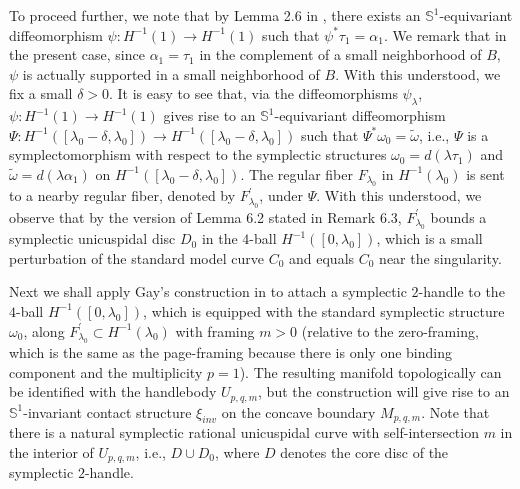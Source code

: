 \documentclass[11pt]{amsart}
\theoremstyle{plain}
\numberwithin{theorem}{section}
\theoremstyle{definition}
\newcommand{\s}{{\mathbb S}}
\begin{document}
To proceed further, we note that by Lemma 2.6 in \cite{C1}, there exists an $\s^1$-equivariant diffeomorphism 
$\psi: H^{-1}(1)\rightarrow H^{-1}(1)$ such that $\psi^\ast \tau_1=\alpha_1$. We remark that in the present case, since $\alpha_1=\tau_1$ in the complement of a small neighborhood of $B$, $\psi$ is actually supported in a small neighborhood of $B$. With this understood, we fix a small $\delta>0$. It is easy to see that, via the diffeomorphisms 
$\psi_\lambda$, $\psi: H^{-1}(1)\rightarrow H^{-1}(1)$ gives rise to an $\s^1$-equivariant diffeomorphism 
$\Psi: H^{-1}([\lambda_0-\delta,\lambda_0])\rightarrow H^{-1}([\lambda_0-\delta,\lambda_0])$ such that 
$\Psi^\ast \omega_0=\tilde{\omega}$, i.e., $\Psi$ is a symplectomorphism with respect to the symplectic structures 
$\omega_0=d(\lambda\tau_1)$ and $\tilde{\omega}=d(\lambda\alpha_1)$ on 
$H^{-1}([\lambda_0-\delta,\lambda_0])$. The regular fiber $F_{\lambda_0}$ in $H^{-1}(\lambda_0)$ is sent to a nearby regular fiber, denoted by $F_{\lambda_0}^\prime$, under $\Psi$. With this understood, we observe that 
by the version of Lemma 6.2 stated in Remark 6.3, 
$F_{\lambda_0}^\prime$ bounds a symplectic unicuspidal disc $D_0$ in the $4$-ball $H^{-1}([0,\lambda_0])$, 
which is a small perturbation of the standard model curve $C_0$ and equals $C_0$ near the singularity. 

Next we shall apply Gay's construction in \cite{G} to attach a symplectic $2$-handle to the $4$-ball 
$H^{-1}([0,\lambda_0])$, which is equipped with the standard symplectic structure $\omega_0$, along 
$F_{\lambda_0}^\prime\subset H^{-1}(\lambda_0)$ with framing $m>0$ (relative to the zero-framing, which is the same as the page-framing because there is only one binding component and the multiplicity $p=1$). The resulting manifold topologically can be identified with the handlebody $U_{p,q,m}$, but the construction will give rise to an
$\s^1$-invariant contact structure $\xi_{inv}$ on the concave boundary $M_{p,q,m}$.
Note that there is a natural symplectic rational unicuspidal curve with self-intersection $m$ in the interior of
$U_{p,q,m}$, i.e., $D\cup D_0$, where $D$ denotes the core disc of the symplectic $2$-handle. 
\end{document}
